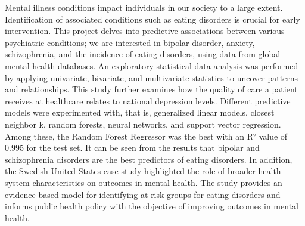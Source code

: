 Mental illness conditions impact individuals in our society to a large extent. Identification of associated conditions such as eating disorders is crucial for early intervention. This project delves into predictive associations between various psychiatric conditions; we are interested in bipolar disorder, anxiety, schizophrenia, and the incidence of eating disorders, using data from global mental health databases.
An exploratory statistical data analysis was performed by applying univariate, bivariate, and multivariate statistics to uncover patterns and relationships. This study further examines how the quality of care a patient receives at healthcare relates to national depression levels.
Different predictive models were experimented with, that is, generalized linear models, closest neighbor k, random forests, neural networks, and support vector regression. Among these, the Random Forest Regressor was the best with an R² value of 0.995 for the test set. It can be seen from the results that bipolar and schizophrenia disorders are the best predictors of eating disorders. In addition, the Swedish-United States case study highlighted the role of broader health system characteristics on outcomes in mental health. The study provides an evidence-based model for identifying at-risk groups for eating disorders and informs public health policy with the objective of improving outcomes in mental health.